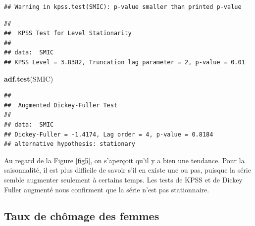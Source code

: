 \documentclass[11pt,]{article}
\newenvironment{Shaded}{\begin{snugshade}}{\end{snugshade}}
\newcommand{\KeywordTok}[1]{\textcolor[rgb]{0.13,0.29,0.53}{\textbf{#1}}}
\newcommand{\DataTypeTok}[1]{\textcolor[rgb]{0.13,0.29,0.53}{#1}}
\newcommand{\DecValTok}[1]{\textcolor[rgb]{0.00,0.00,0.81}{#1}}
\newcommand{\FloatTok}[1]{\textcolor[rgb]{0.00,0.00,0.81}{#1}}
\newcommand{\StringTok}[1]{\textcolor[rgb]{0.31,0.60,0.02}{#1}}
\newcommand{\OperatorTok}[1]{\textcolor[rgb]{0.81,0.36,0.00}{\textbf{#1}}}
\newcommand{\NormalTok}[1]{#1}
\begin{document}
\begin{verbatim}
## Warning in kpss.test(SMIC): p-value smaller than printed p-value
\end{verbatim}

\begin{verbatim}
## 
##  KPSS Test for Level Stationarity
## 
## data:  SMIC
## KPSS Level = 3.8382, Truncation lag parameter = 2, p-value = 0.01
\end{verbatim}

\begin{Shaded}
\begin{Highlighting}[]
  \KeywordTok{adf.test}\NormalTok{(SMIC)}
\end{Highlighting}
\end{Shaded}

\begin{verbatim}
## 
##  Augmented Dickey-Fuller Test
## 
## data:  SMIC
## Dickey-Fuller = -1.4174, Lag order = 4, p-value = 0.8184
## alternative hypothesis: stationary
\end{verbatim}

Au regard de la Figure \ref{fig5}, on s'aperçoit qu'il y a bien une
tendance. Pour la saisonnalité, il est plus difficile de savoir s'il en
existe une ou pas, puisque la série semble augmenter seulement à
certains temps. Les tests de KPSS et de Dickey Fuller augmenté nous
confirment que la série n'est pas stationnaire.

\subsection{\texorpdfstring{Taux de chômage des femmes
\label{TCHOF}}{Taux de chômage des femmes }}\label{taux-de-chomage-des-femmes}

\begin{Shaded}
\end{Shaded}
\end{document}
